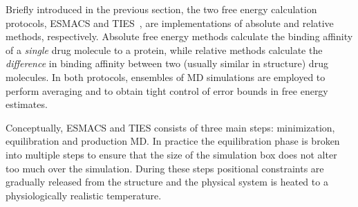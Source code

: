  
Briefly introduced in the previous section, the two free energy calculation 
protocols, ESMACS and TIES~\cite{Wan2017brd4, Bhati2017}, are 
implementations of absolute and relative methods, respectively. 
Absolute free energy methods calculate the binding affinity of a \emph{single} 
drug molecule to a protein, while relative methods calculate the 
\emph{difference} in binding affinity between two (usually similar in structure) 
drug molecules. In both protocols, ensembles of MD simulations are employed to 
perform averaging and to obtain tight control of error bounds in free energy 
estimates.





Conceptually, ESMACS and TIES consists of three main steps: minimization, 
equilibration and production MD. In practice the equilibration phase is broken 
into multiple steps to ensure that the size of the simulation box does not alter 
too much over the simulation. During these steps positional constraints are 
gradually released from the structure and the physical system is heated to a 
physiologically realistic temperature. 

